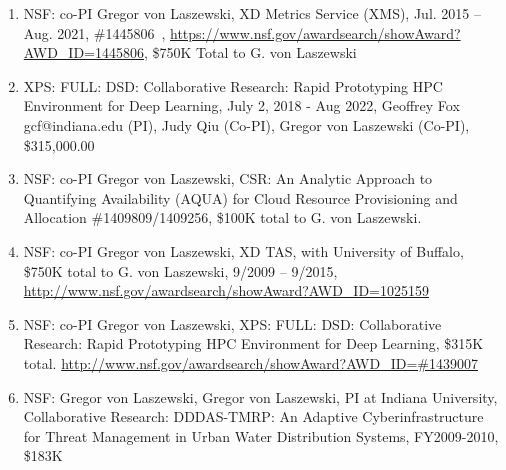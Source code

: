 \documentclass{article}
\begin{document}
\begin{enumerate}

  
\item  NSF: co-PI Gregor von Laszewski, XD Metrics Service (XMS), Jul. 2015 – Aug. 2021, \#1445806 , \url{https://www.nsf.gov/awardsearch/showAward?AWD_ID=1445806}, \$750K Total to G. von Laszewski
\item  XPS: FULL: DSD: Collaborative Research: Rapid Prototyping HPC Environment for Deep Learning, July 2, 2018 - Aug 2022, Geoffrey Fox gcf@indiana.edu (PI), Judy Qiu (Co-PI), Gregor von Laszewski (Co-PI), 	\$315,000.00
\item  NSF: co-PI Gregor von Laszewski, CSR: An Analytic Approach to Quantifying Availability (AQUA) for Cloud Resource Provisioning and Allocation \#1409809/1409256, \$100K total to G. von Laszewski. 

\item  NSF: co-PI Gregor von Laszewski, XD TAS, with University of Buffalo, \$750K total to G. von Laszewski, 9/2009 – 9/2015, \url{http://www.nsf.gov/awardsearch/showAward?AWD_ID=1025159}

\item  NSF: co-PI Gregor von Laszewski, XPS: FULL: DSD: Collaborative Research: Rapid Prototyping HPC Environment for Deep Learning, \$315K total.
  \url{http://www.nsf.gov/awardsearch/showAward?AWD_ID=\#1439007}

\item  NSF: Gregor von Laszewski, Gregor von Laszewski, PI at Indiana University, Collaborative Research: DDDAS-TMRP: An Adaptive Cyberinfrastructure for Threat Management in Urban Water Distribution Systems, FY2009-2010, \$183K
  

\end{enumerate}
\end{document}
